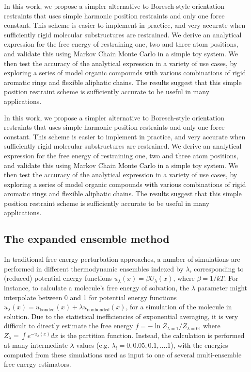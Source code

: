 \documentclass[%
 aip,
rsi,%
 amsmath,amssymb,
 reprint,%
]{revtex4-1}
\begin{document}
In this work, we propose a simpler alternative to Boresch-style orientation restraints that uses simple harmonic position restraints and only one force constant.  This scheme is easier to implement in practice, and very accurate when sufficiently rigid molecular substructures are restrained.  We derive an analytical expression for the free energy of restraining one, two and three atom positions, and validate this using Markov Chain Monte Carlo in a simple toy system.  We then test the accuracy of the analytical expression in a variety of use cases, by exploring a series of model organic compounds with various combinations of rigid aromatic rings and flexible aliphatic chains.   The results suggest that this simple position restraint scheme is sufficiently accurate to be useful in many applications.


In this work, we propose a simpler alternative to Boresch-style orientation restraints that uses simple harmonic position restraints and only one force constant.  This scheme is easier to implement in practice, and very accurate when sufficiently rigid molecular substructures are restrained.  We derive an analytical expression for the free energy of restraining one, two and three atom positions, and validate this using Markov Chain Monte Carlo in a simple toy system.  We then test the accuracy of the analytical expression in a variety of use cases, by exploring a series of model organic compounds with various combinations of rigid aromatic rings and flexible aliphatic chains.   The results suggest that this simple position restraint scheme is sufficiently accurate to be useful in many applications.




\subsection*{The expanded ensemble method}

In traditional free energy perturbation approaches, a number of simulations are performed in different thermodynamic ensembles indexed by $\lambda$, corresponding to (reduced) potential energy functions $u_{\lambda}(x) = \beta U_{\lambda}(x)$, where $\beta = 1/kT$.  For instance, to calculate a molecule's free energy of solvation, the $\lambda$ parameter might interpolate between 0 and 1 for potential energy functions $u_{\lambda}(x) = u_{\text{bonded}}(x) + \lambda u_{\text{nonbonded}}(x)$, for a simulation of the molecule in solution.  Due to the statistical inefficiencies of exponential averaging, it is very difficult to directly estimate the free energy $f = -\ln Z_{\lambda=1}/Z_{\lambda=0}$, where $Z_{\lambda} = \int e^{-u_{\lambda}(x)} dx$ is the partition function.  Instead,  the calculation is performed at many intermediate $\lambda$ values (e.g. $\lambda_i = 0, 0.05, 0.1, .... 1$), with the energies computed from these simulations used as input to one of several multi-ensemble free energy estimators.\cite{shirts2008statistically, TI} 
\end{document}

